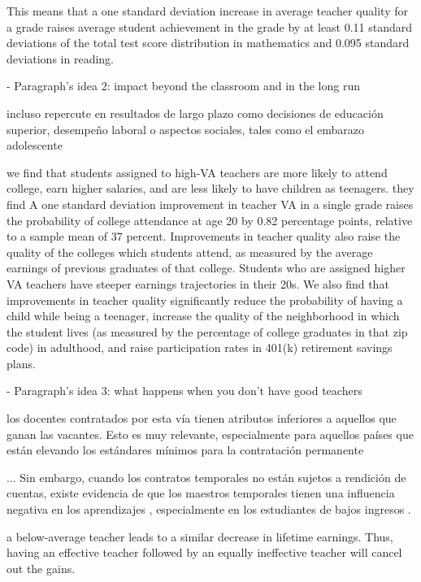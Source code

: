 This means that a one standard deviation increase in average teacher quality for a grade raises average student achievement in the grade by at least 0.11 standard deviations of the total test score distribution in mathematics and 0.095 standard deviations in reading. \citep{Rivkin_et_al_2005}


- Paragraph's idea 2: impact beyond the classroom and in the long run

incluso repercute en resultados de largo plazo como decisiones de educación superior, desempeño laboral o aspectos sociales, tales como el embarazo adolescente \citep{Bertoni_et_al_2020b}

we find that students assigned to high-VA teachers are more likely to attend college, earn higher salaries, and are less likely to have children as teenagers. they find A one standard deviation improvement in teacher VA in a single grade raises the probability of college attendance at age 20 by 0.82 percentage points, relative to a sample mean of 37 percent. Improvements in teacher quality also raise the quality of the colleges which students attend, as measured by the average earnings of previous graduates of that college. Students who are assigned higher VA teachers have steeper earnings trajectories in their 20s. We also find that improvements in teacher quality significantly reduce the probability of having a child while being a teenager, increase the quality of the neighborhood in which the student lives (as measured by the percentage of college graduates in that zip code) in adulthood, and raise participation rates in 401(k) retirement savings plans. \citep{Chetty_et_al_2014b}



- Paragraph's idea 3: what happens when you don't have good teachers


los docentes contratados por esta vía tienen atributos inferiores a aquellos que ganan las vacantes. Esto es muy relevante, especialmente para aquellos países que están elevando los estándares mínimos para la contratación permanente \citep{Bertoni_et_al_2020a}


... Sin embargo, cuando los contratos temporales no están sujetos a rendición de cuentas, existe evidencia de que los maestros temporales tienen una influencia negativa en los aprendizajes \citep{Ayala_2017}, especialmente en los estudiantes de bajos ingresos \citep{Marotta_2019}.


a below-average teacher leads to a similar decrease in lifetime earnings. Thus, having an effective teacher followed by an equally ineffective teacher will cancel out the gains. \citep{Hanushek_et_al_2012}


